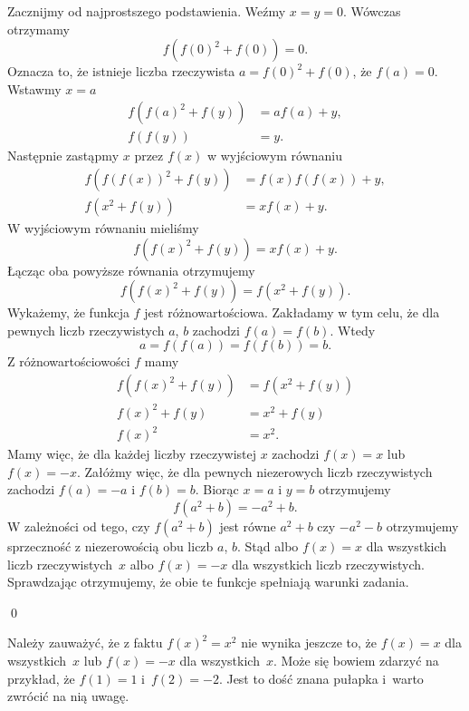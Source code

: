 \noindent
Zacznijmy od najprostszego podstawienia. Weźmy $x = y = 0$. Wówczas otrzymamy
\[
	f(f(0)^2 + f(0)) = 0.
\]
Oznacza to, że istnieje  liczba rzeczywista $a = f(0)^2 + f(0)$, że $f(a) = 0$. Wstawmy $x = a$
\begin{align*}
	f(f(a)^2 + f(y)) &= af(a) + y, \\
	f(f(y)) &= y.
\end{align*}
Następnie zastąpmy $x$ przez $f(x)$ w wyjściowym równaniu
\begin{align*}
	f(f(f(x))^2 + f(y)) &= f(x)f(f(x)) + y, \\
	f(x^2 + f(y)) &= xf(x) + y.
\end{align*}
W wyjściowym równaniu mieliśmy
\[
	f(f(x)^2 + f(y)) = xf(x) + y.
\]
Łącząc oba powyższe równania otrzymujemy
\[
	f(f(x)^2 + f(y)) = f(x^2 + f(y)).
\]
Wykażemy, że funkcja $f$ jest różnowartościowa. Zakładamy w tym celu, że dla pewnych liczb rzeczywistych $a$, $b$ zachodzi $f(a) = f(b)$. Wtedy
\[
	a = f(f(a)) = f(f(b)) = b.
\]
Z różnowartościowości $f$ mamy
\begin{align*}
	f(f(x)^2 + f(y)) &= f(x^2 + f(y)) \\
	f(x)^2 + f(y) &= x^2 + f(y) \\
	f(x)^2 &= x^2.
\end{align*}
Mamy więc, że dla każdej liczby rzeczywistej $x$ zachodzi $f(x) = x$ lub $f(x) = -x$. Załóżmy więc, że dla pewnych niezerowych liczb rzeczywistych zachodzi $f(a) = -a$ i $f(b) = b$. Biorąc $x = a$ i $y = b$ otrzymujemy
\[
	f(a^2 + b) = -a^2 + b.
\]
W zależności od tego, czy $f(a^2 + b)$ jest równe $a^2 + b$ czy $-a^2 - b$ otrzymujemy sprzeczność z niezerowością obu liczb $a$, $b$. Stąd albo $f(x) = x$ dla wszystkich liczb rzeczywistych~$x$ albo $f(x) = -x$ dla wszystkich liczb rzeczywistych. Sprawdzając otrzymujemy, że obie te funkcje spełniają warunki zadania.

\qed

\vspace{10px}
\noindent
Należy zauważyć, że z faktu $f(x)^2 = x^2$ nie wynika jeszcze to, że $f(x) = x$ dla wszystkich~$x$ lub $f(x) = -x$ dla wszystkich~$x$. Może się bowiem zdarzyć na przykład, że $f(1) = 1$ i~$f(2) = -2$. Jest to dość znana pułapka i~warto zwrócić na nią uwagę.
